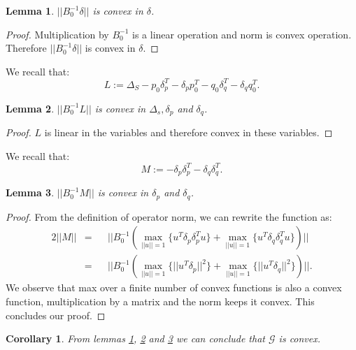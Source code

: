 \documentclass{sig-alternate-05-2015}
\newtheorem{lemma}{Lemma}
\newtheorem{corollary}{Corollary}
\begin{document}
\begin{lemma} \label{delta}
$||B_0^{-1}\delta||$ is convex in $\delta$.
\end{lemma}
\begin{proof}
Multiplication by $B_0^{-1}$ is a linear operation and norm is convex
operation. Therefore $||B_0^{-1}\delta||$ is convex in $\delta$.
\end{proof}

We recall that:
\begin{equation*} 
L:= \Delta_S - p_0\delta_p^T - \delta_pp_0^T - q_0\delta_q^T - \delta_qq_0^T.
\end{equation*}
\begin{lemma} \label{L}
$||B_0^{-1}L||$ is convex in $\Delta_s, \delta_p$
and $\delta_q$.
\end{lemma}
\begin{proof}
$L$ is linear in the variables and therefore convex in these variables.

\end{proof}

We recall that:
\begin{equation*} 
M:= - \delta_p\delta_p^T - \delta_q\delta_q^T.
\end{equation*}

\begin{lemma} \label{M}
$||B_0^{-1}M||$ is convex in $\delta_p$
and $\delta_q$.
\end{lemma}
\begin{proof}
From the definition of operator norm, we can rewrite the function as:
\begin{alignat*} {2}
||M|| & = && ||B_0^{-1}(\max_{||u||=1}{\{u^T \delta_p\delta_p^T u\}} +
\max_{||u||=1}{\{u^T \delta_q\delta_q^T u\}})||\\
& = && ||B_0^{-1}(\max_{||u||=1}{\{||u^T \delta_p||^2\}} +
\max_{||u||=1}{\{||u^T \delta_q||^2\}})||.
\end{alignat*}
We observe that max over a finite number of convex functions is also a convex
function, multiplication by a matrix and the norm keeps it convex.
This concludes our proof.
\end{proof}

\begin{corollary}
From lemmas \ref{delta}, \ref{L} and \ref{M} we can conclude that $\mathcal{G}$
is convex.
\end{corollary}
\end{document}
